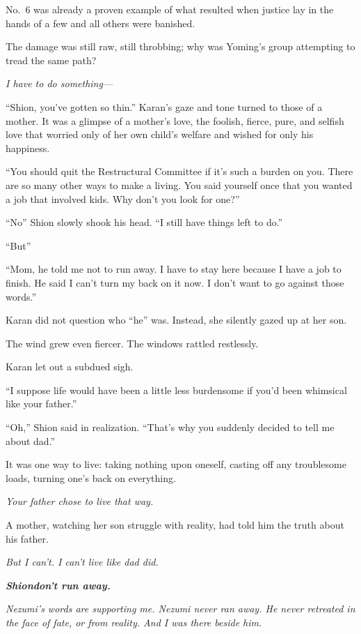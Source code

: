 No.~6 was already a proven example of what resulted when justice lay in
the hands of a few and all others were banished.

The damage was still raw, still throbbing; why was Yoming's group
attempting to tread the same path?

\emph{I have to do something---}

``Shion, you've gotten so thin.'' Karan's gaze and tone turned to those
of a mother. It was a glimpse of a mother's love, the foolish, fierce,
pure, and selfish love that worried only of her own child's welfare and
wished for only his happiness.

``You should quit the Restructural Committee if it's such a burden on
you. There are so many other ways to make a living. You said yourself
once that you wanted a job that involved kids. Why don't you look for
one?''

``No\el '' Shion slowly shook his head. ``I still have things left to
do.''

``But\el ''

``Mom, he told me not to run away. I have to stay here because I have a
job to finish. He said I can't turn my back on it now. I don't want to
go against those words.''

Karan did not question who ``he'' was. Instead, she silently gazed up at
her son.

The wind grew even fiercer. The windows rattled restlessly.

Karan let out a subdued sigh.

``I suppose life would have been a little less burdensome if you'd been
whimsical like your father.''

``Oh,'' Shion said in realization. ``That's why you suddenly decided to
tell me about dad.''

It was one way to live: taking nothing upon oneself, casting off any
troublesome loads, turning one's back on everything.

\emph{Your father chose to live that way.}

A mother, watching her son struggle with reality, had told him the truth
about his father.

\emph{But I can't. I can't live like dad did.}

\emph{\textbf{Shion\el don't run away.}}

\emph{Nezumi's words are supporting me. Nezumi never ran away. He never
retreated in the face of fate, or from reality. And I was there beside
him.}

